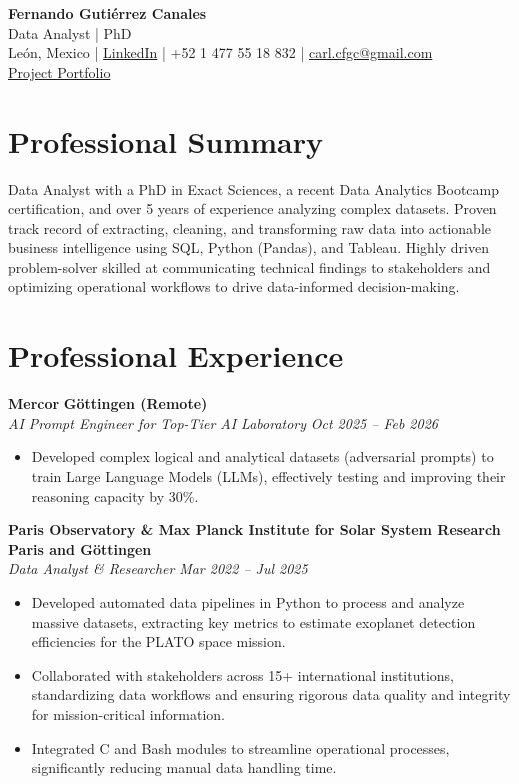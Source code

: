 \documentclass[10pt,a4paper]{article}
\begin{document}
\begin{center}
    {\Huge \textbf{Fernando Gutiérrez Canales}}\\
    {\Large Data Analyst | PhD}\\    
    León, Mexico \quad | \quad \href{https://www.linkedin.com/in/fernando-guti%C3%A9rrez-canales-804876343/}{LinkedIn} \quad | \quad +52 1 477 55 18 832 \quad | \quad \href{mailto:carl.cfgc@gmail.com}{carl.cfgc@gmail.com} \\
     \href{https://fernando-canales.github.io/#projects}{Project Portfolio}
\end{center}

\vspace{1em}

\section*{Professional Summary}
Data Analyst with a PhD in Exact Sciences, a recent Data Analytics Bootcamp certification, and over 5 years of experience analyzing complex datasets. Proven track record of extracting, cleaning, and transforming raw data into actionable business intelligence using SQL, Python (Pandas), and Tableau. Highly driven problem-solver skilled at communicating technical findings to stakeholders and optimizing operational workflows to drive data-informed decision-making.

\section*{Professional Experience}
\textbf{Mercor} \hfill \textbf{Göttingen (Remote)} \\
\textit{AI Prompt Engineer for Top-Tier AI Laboratory} \hfill \textit{Oct 2025 -- Feb 2026}
\begin{itemize}[leftmargin=1.5em]
	\item Developed complex logical and analytical datasets (adversarial prompts) to train Large Language Models (LLMs), effectively testing and improving their reasoning capacity by 30\%.
\end{itemize}

\textbf{Paris Observatory \& Max Planck Institute for Solar System Research} \hfill \textbf{Paris and Göttingen} \\
\textit{Data Analyst \& Researcher} \hfill \textit{Mar 2022 -- Jul 2025}
\begin{itemize}[leftmargin=1.5em]
    \item Developed automated data pipelines in Python to process and analyze massive datasets, extracting key metrics to estimate exoplanet detection efficiencies for the PLATO space mission.
    \item Collaborated with stakeholders across 15+ international institutions, standardizing data workflows and ensuring rigorous data quality and integrity for mission-critical information.
    \item Integrated C and Bash modules to streamline operational processes, significantly reducing manual data handling time.
\end{itemize}
\end{document}

